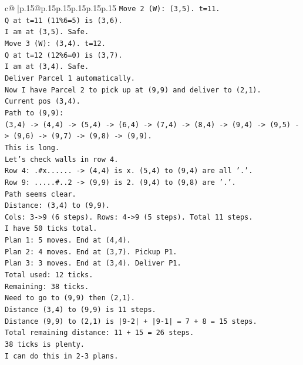 \documentclass{article}
\begin{document}
{\begin{supertabular}{c@{$\;$}|p{.15\linewidth}@{}p{.15\linewidth}p{.15\linewidth}p{.15\linewidth}p{.15\linewidth}p{.15\linewidth}}
{{{\texttt{Move 2 (W): (3,5). t=11.} \\
\texttt{Q at t=11 (11\%6=5) is (3,6).} \\
\texttt{I am at (3,5). Safe.} \\
\texttt{Move 3 (W): (3,4). t=12.} \\
\texttt{Q at t=12 (12\%6=0) is (3,7).} \\
\texttt{I am at (3,4). Safe.} \\
\texttt{Deliver Parcel 1 automatically.} \\
\texttt{Now I have Parcel 2 to pick up at (9,9) and deliver to (2,1).} \\
\texttt{Current pos (3,4).} \\
\texttt{Path to (9,9):} \\
\texttt{(3,4) {-}> (4,4) {-}> (5,4) {-}> (6,4) {-}> (7,4) {-}> (8,4) {-}> (9,4) {-}> (9,5) {-}> (9,6) {-}> (9,7) {-}> (9,8) {-}> (9,9).} \\
\texttt{This is long.} \\
\texttt{Let's check walls in row 4.} \\
\texttt{Row 4: .\#x...... {-}> (4,4) is x. (5,4) to (9,4) are all '.'.} \\
\texttt{Row 9: .....\#..2 {-}> (9,9) is 2. (9,4) to (9,8) are '.'.} \\
\texttt{Path seems clear.} \\
\texttt{Distance: (3,4) to (9,9).} \\
\texttt{Cols: 3{-}>9 (6 steps). Rows: 4{-}>9 (5 steps). Total 11 steps.} \\
\texttt{I have 50 ticks total.} \\
\texttt{Plan 1: 5 moves. End at (4,4).} \\
\texttt{Plan 2: 4 moves. End at (3,7). Pickup P1.} \\
\texttt{Plan 3: 3 moves. End at (3,4). Deliver P1.} \\
\texttt{Total used: 12 ticks.} \\
\texttt{Remaining: 38 ticks.} \\
\texttt{Need to go to (9,9) then (2,1).} \\
\texttt{Distance (3,4) to (9,9) is 11 steps.} \\
\texttt{Distance (9,9) to (2,1) is |9{-}2| + |9{-}1| = 7 + 8 = 15 steps.} \\
\texttt{Total remaining distance: 11 + 15 = 26 steps.} \\
\texttt{38 ticks is plenty.} \\
\texttt{I can do this in 2{-}3 plans.} \\
}}}
\end{supertabular}}
\end{document}
